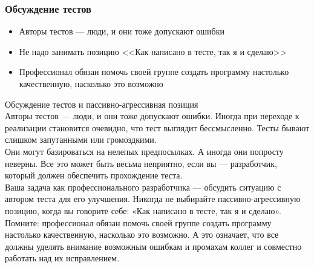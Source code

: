\documentclass{../industrial-development}
\begin{document}
\begin{frame} \frametitle{Обсуждение тестов}
\begin{itemize}
  \item Авторы тестов — люди, и они тоже допускают ошибки
  \item Не надо занимать позицию <<Как написано в тесте, так я и сделаю>>
	\item Профессионал обязан помочь своей группе создать программу
настолько качественную, насколько это возможно
\end{itemize}
\end{frame}
\lecturenotes
Обсуждение тестов и пассивно-агрессивная позиция\\
Авторы тестов — люди, и они тоже допускают ошибки. Иногда при переходе к реализации становится очевидно, что тест выглядит бессмысленно. Тесты бывают слишком запутанными или громоздкими.\\
Они могут базироваться на нелепых предпосылках. А иногда они попросту неверны. Все это может быть весьма неприятно, если вы — разработчик, который должен обеспечить прохождение теста.\\
Ваша задача как профессионального разработчика — обсудить ситуацию с автором теста для его улучшения. Никогда не выбирайте пассивно-агрессивную позицию, когда вы говорите себе: «Как написано в тесте, так я и сделаю».\\
Помните: профессионал обязан помочь своей группе создать программу настолько качественную, насколько это возможно. А это означает, что все должны уделять внимание возможным ошибкам и промахам коллег и совместно работать над их исправлением.
\end{document}
